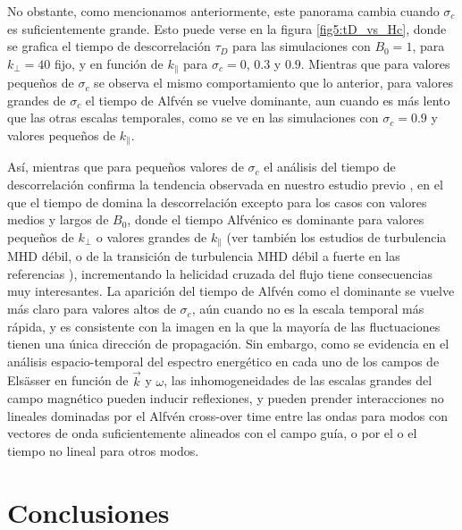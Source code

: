 No obstante, como mencionamos anteriormente, este panorama cambia
cuando $\sigma_c$ es suficientemente grande. Esto puede verse en la
figura \cref{fig5:tD_vs_Hc}, donde se grafica el tiempo de
descorrelación $\tau_D$ para las simulaciones con $B_0=1$, para
$k_\perp=40$ fijo, y en función de $k_\parallel$ para $\sigma_c = 0$,
$0.3$ y $0.9$. Mientras que para valores pequeños de $\sigma_c$ se
observa el mismo comportamiento que lo anterior, para valores grandes
de $\sigma_c$ el tiempo de Alfvén se vuelve dominante, aun cuando es
más lento que las otras escalas temporales, como se ve en las
simulaciones con $\sigma_c=0.9$ y valores pequeños de $k_\parallel$.

Así, mientras que para pequeños valores de $\sigma_c$ el análisis del
tiempo de descorrelación confirma la tendencia observada en nuestro
estudio previo \cite{lugones_2016_spatiotemporal}, en el que el tiempo
de \sweeping domina la descorrelación excepto para los casos con
valores medios y largos de $B_0$, donde el tiempo Alfvénico es
dominante para valores pequeños de $k_{\perp}$ o valores grandes de
$k_{\parallel}$ (ver también los estudios de turbulencia MHD débil, o
de la transición de turbulencia MHD débil a fuerte en las referencias
\cite{meyrand_weak_2015, lugones_2016_spatiotemporal,
  meyrand_direct_2016}), incrementando la helicidad cruzada del flujo
tiene consecuencias muy interesantes.  La aparición del tiempo de
Alfvén como el dominante se vuelve más claro para valores altos de
$\sigma_c$, aún cuando no es la escala temporal más rápida, y es
consistente con la imagen en la que la mayoría de las fluctuaciones
tienen una única dirección de propagación.  Sin embargo, como se
evidencia en el análisis espacio-temporal del espectro energético en
cada uno de los campos de Els\"asser en función de $\vec{k}$ y
$\omega$, las inhomogeneidades de las escalas grandes del campo
magnético pueden inducir reflexiones, y pueden {\color{red} prender}
interacciones no lineales dominadas por el {\color{red} Alfv\'en
  cross-over time} entre las ondas para modos con vectores de onda
suficientemente alineados con el campo guía, o por el \sweeping o el
tiempo no lineal para otros modos.

\section{Conclusiones}\label{sec_Conclusions}

